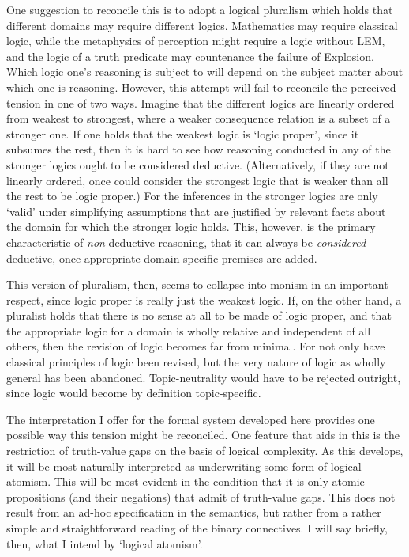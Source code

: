 One suggestion to reconcile this is to adopt a logical pluralism which holds that different domains may require different logics. Mathematics may require classical logic, while the metaphysics of perception might require a logic without LEM, and the logic of a truth predicate may countenance the failure of Explosion. Which logic one's reasoning is subject to will depend on the subject matter about which one is reasoning. However, this attempt will fail to reconcile the perceived tension in one of two ways. Imagine that the different logics are linearly ordered from weakest to strongest, where a weaker consequence relation is a subset of a stronger one. If one holds that the weakest logic is `logic proper', since it subsumes the rest, then it is hard to see how reasoning conducted in any of the stronger logics ought to be considered deductive. (Alternatively, if they are not linearly ordered, once could consider the strongest logic that is weaker than all the rest to be logic proper.) For the inferences in the stronger logics are only `valid' under simplifying assumptions that are justified by relevant facts about the domain for which the stronger logic holds. This, however, is the primary characteristic of \emph{non}-deductive reasoning, that it can always be \emph{considered} deductive, once appropriate domain-specific premises are added.

This version of pluralism, then, seems to collapse into monism in an important respect, since logic proper is really just the weakest logic.  If, on the other hand, a pluralist holds that there is no sense at all to be made of logic proper, and that the appropriate logic for a domain is wholly relative and independent of all others, then the revision of logic becomes far from minimal. For not only have classical principles of logic been revised, but the very nature of logic as wholly general has been abandoned. Topic-neutrality would have to be rejected outright, since logic would become by definition topic-specific.

The interpretation I offer for the formal system developed here provides one possible way this tension might be reconciled. One feature that aids in this is the restriction of truth-value gaps on the basis of logical complexity. As this develops, it will be most naturally interpreted as underwriting some form of logical atomism. This will be most evident in the condition that it is only atomic propositions (and their negations) that admit of truth-value gaps. This does not result from an ad-hoc specification in the semantics, but rather from a rather simple and straightforward reading of the binary connectives. I will say briefly, then, what I intend by `logical atomism'.

